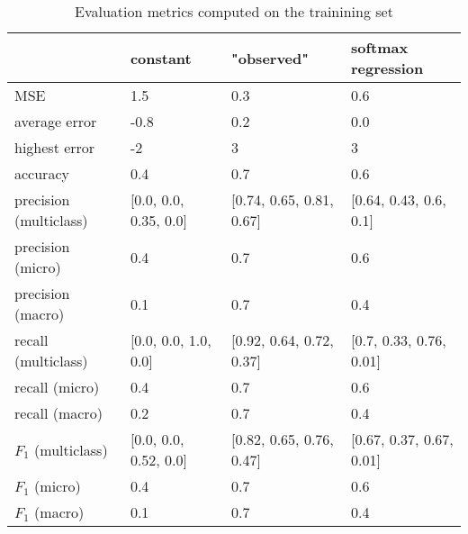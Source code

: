 \begin{table}[h]
\caption{Evaluation metrics computed on the trainining set}
\label{tbl:sais_eval_trainining}
\begin{tabular}{llll}
\toprule
 & constant & "observed" & softmax regression \\
\midrule
MSE & 1.5 & 0.3 & 0.6 \\
average error & -0.8 & 0.2 & 0.0 \\
highest error & -2 & 3 & 3 \\
accuracy & 0.4 & 0.7 & 0.6 \\
precision (multiclass) & [0.0, 0.0, 0.35, 0.0] & [0.74, 0.65, 0.81, 0.67] & [0.64, 0.43, 0.6, 0.1] \\
precision (micro) & 0.4 & 0.7 & 0.6 \\
precision (macro) & 0.1 & 0.7 & 0.4 \\
recall (multiclass) & [0.0, 0.0, 1.0, 0.0] & [0.92, 0.64, 0.72, 0.37] & [0.7, 0.33, 0.76, 0.01] \\
recall (micro) & 0.4 & 0.7 & 0.6 \\
recall (macro) & 0.2 & 0.7 & 0.4 \\
$F_1$ (multiclass) & [0.0, 0.0, 0.52, 0.0] & [0.82, 0.65, 0.76, 0.47] & [0.67, 0.37, 0.67, 0.01] \\
$F_1$ (micro) & 0.4 & 0.7 & 0.6 \\
$F_1$ (macro) & 0.1 & 0.7 & 0.4 \\
\bottomrule
\end{tabular}
\end{table}
